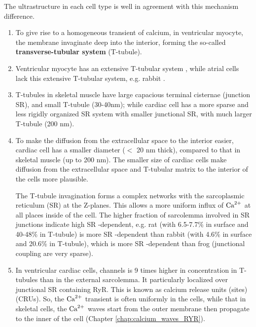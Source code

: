 The ultrastructure in each cell type is well in agreement with this mechanism
difference.
\begin{enumerate}
  \item  To give rise to a homogeneous transient of calcium, in ventricular
  myocyte, the membrane invaginate deep into the interior, forming the so-called
  {\bf transverse-tubular system} (T-tubule). 
  
  \item Ventricular myocyte has an   extensive T-tubular system
  \citep{cheng1994, wier1995}, while atrial cells lack this extensive T-tubular
  system, e.g. rabbit \citep{carl1995}.
  
  \item T-tubules in skeletal muscle have large capacious terminal cisternae
  (junction SR), and small T-tubule (30-40nm); while cardiac cell has a more
  sparse and less rigidly organized SR system with smaller junctional SR, with
  much larger T-tubule (200 nm). 

   \item To make the diffusion from the extracellular space to the interior easier,
cardiac cell has a smaller diameter ($<$ 20 nm thick), compared to that in
skeletal muscle (up to 200 nm). The smaller size of cardiac cells make diffusion
from the extracellular space and T-tubular matrix to the interior of the cells
more plausible. 

The T-tubule invagination forms a complex networks with the sarcoplasmic
reticulum (SR) at the Z-planes. This allows a more uniform influx of ${\text{Ca}^{2+}}$ at
all places inside of the cell.
The higher fraction of sarcolemma involved in SR junctions indicate high SR
-dependent, e.g. rat (with 6.5-7.7\% in surface and 40-48\% in
T-tubule) is more SR -dependent than rabbit (with 4.6\% in surface and
20.6\% in T-tubule), which is more SR -dependent than frog (junctional
coupling are very sparse).
   
   \item In ventricular cardiac cells,  channels is 9 times
higher in concentration in T-tubules than in the external  sarcolemma. It
particularly localized over junctional SR containing RyR. This is known as
calcium release units (sites) (CRUs). So, the ${\text{Ca}^{2+}}$ transient is often uniformly
in the cells, while that in skeletal cells, the ${\text{Ca}^{2+}}$ waves start from the outer
membrane then propagate to the inner of the cell (Chapter
\ref{chap:calcium_waves_RYR}).
       
\end{enumerate}

